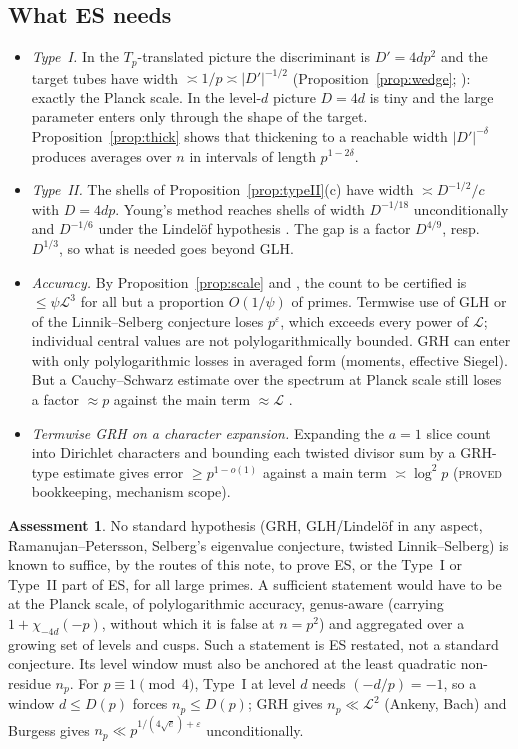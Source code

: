\documentclass[10pt,reqno]{amsart}
\theoremstyle{definition}
\newtheorem{assessment}[theorem]{Assessment}
\numberwithin{equation}{section}
\newcommand{\cL}{\mathcal L}
\newcommand{\status}[1]{\textup{\textsc{#1}}}
\begin{document}
\subsection{What ES needs}
\begin{itemize}
\item \emph{Type~I.} In the $T_p$-translated picture the discriminant is
$D'=4dp^2$ and the target tubes have width $\asymp1/p\asymp|D'|^{-1/2}$
(Proposition~\ref{prop:wedge}; \cite[Prop.~3.2]{O123}): exactly the Planck
scale. In the level-$d$ picture $D=4d$ is tiny and the large parameter
enters only through the shape of the target. Proposition~\ref{prop:thick}
shows that thickening to a reachable width $|D'|^{-\delta}$ produces
averages over $n$ in intervals of length $p^{1-2\delta}$.
\item \emph{Type~II.} The shells of Proposition~\ref{prop:typeII}(c) have
width $\asymp D^{-1/2}/c$ with $D=4dp$. Young's method reaches shells of
width $D^{-1/18}$ unconditionally and $D^{-1/6}$ under the Lindel\"of
hypothesis \cite[\S4]{O128}. The gap is a factor $D^{4/9}$, resp.\
$D^{1/3}$, so what is needed goes beyond GLH.
\item \emph{Accuracy.} By Proposition~\ref{prop:scale} and
\cite[Thm.~5.1]{O123}, the count to be certified is $\le\psi\cL^3$ for all but
a proportion $O(1/\psi)$ of primes. Termwise use of GLH or of the
Linnik--Selberg conjecture loses $p^\varepsilon$, which exceeds every power of
$\cL$; individual central values are not polylogarithmically bounded.
GRH can enter with only polylogarithmic losses in averaged form (moments,
effective Siegel). But a Cauchy--Schwarz estimate over the spectrum at
Planck scale still loses a factor $\approx p$ against the main term
$\approx\cL$ \cite[\S5]{O123}.
\item \emph{Termwise GRH on a character expansion.} Expanding the $a=1$
slice count into Dirichlet characters and bounding each twisted divisor
sum by a GRH-type estimate gives error $\ge p^{1-o(1)}$ against a main term
$\asymp\log^2p$ \cite[Prop.~9.1]{O127} (\status{proved} bookkeeping, mechanism
scope).
\end{itemize}

\begin{assessment}\label{ass:verdict}
No standard hypothesis (GRH, GLH/Lindel\"of in any aspect,
Ramanujan--Petersson, Selberg's eigenvalue conjecture, twisted
Linnik--Selberg) is known to suffice, by the routes of this note, to prove
ES, or the Type~I or Type~II part of ES, for all large primes. A sufficient
statement would have to be at the Planck scale, of polylogarithmic accuracy,
genus-aware (carrying $1+\chi_{-4d}(-p)$, without which it is false at
$n=p^2$) and aggregated over a growing set of levels and cusps. Such a
statement is ES restated, not a standard conjecture. Its level window must
also be anchored at the least quadratic non-residue $n_p$. For
$p\equiv1\pmod4$, Type~I at level $d$ needs $(-d/p)=-1$, so a window
$d\le D(p)$ forces $n_p\le D(p)$; GRH gives $n_p\ll\cL^2$ (Ankeny, Bach) and
Burgess gives $n_p\ll p^{1/(4\sqrt e)+\varepsilon}$ unconditionally.
\end{assessment}
\end{document}
